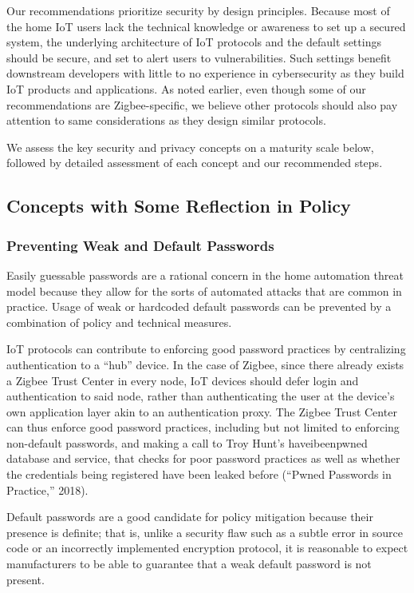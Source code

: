 Our recommendations prioritize security by design principles. Because most of the home IoT users lack the technical knowledge or awareness to set up a secured system, the underlying architecture of IoT protocols and the default settings should be secure, and set to alert users to vulnerabilities. Such settings benefit downstream developers with little to no experience in cybersecurity as they build IoT products and applications. As noted earlier, even though some of our recommendations are Zigbee-specific, we believe other protocols should also pay attention to same considerations as they design similar protocols.

We assess the key security and privacy concepts on a maturity scale below, followed by detailed assessment of each concept and our recommended steps.


\subsection{Concepts with Some Reflection in Policy}

\subsubsection{Preventing Weak and Default Passwords}
Easily guessable passwords are a rational concern in the home automation threat model because they allow for the sorts of automated attacks that are common in practice. Usage of weak or hardcoded default passwords can be prevented by a combination of policy and technical measures.

  IoT protocols can contribute to enforcing good password practices by centralizing authentication to a “hub” device. In the case of Zigbee, since there already exists a Zigbee Trust Center in every node, IoT devices should defer login and authentication to said node, rather than authenticating the user at the device’s own application layer akin to an authentication proxy. The Zigbee Trust Center can thus enforce good password practices, including but not limited to enforcing non-default passwords, and making a call to Troy Hunt’s haveibeenpwned database and service, that checks for poor password practices as well as whether the credentials being registered have been leaked before (“Pwned Passwords in Practice,” 2018).

 Default passwords are a good candidate for policy mitigation because their presence is definite; that is, unlike a security flaw such as a subtle error in source code or an incorrectly implemented encryption protocol, it is reasonable to expect manufacturers to be able to guarantee that a weak default password is not present. 

